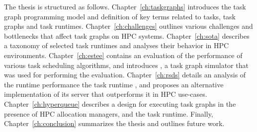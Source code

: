 The thesis is structured as follows. Chapter~\ref{ch:taskgraphs} introduces the task graph
programming model and definition of key terms related to tasks, task graphs and task runtimes.
Chapter~\ref{ch:challenges} outlines various challenges and bottlenecks that affect task graphs
on HPC systems. Chapter~\ref{ch:sota} describes a taxonomy of selected task runtimes and
analyses their behavior in HPC environments. Chapter~\ref{ch:estee} contains an evaluation
of the performance of various task scheduling algorithms, and introduces \estee{}, a
task graph simulator that was used for performing the evaluation. Chapter~\ref{ch:rsds}
details an analysis of the runtime performance the task runtime \dask{}, and
proposes an alternative implementation of its server that outperforms it in HPC use-cases.
Chapter~\ref{ch:hyperqueue} describes a design for executing task graphs in the presence of HPC
allocation managers, and the \hyperqueue{} task runtime. Finally,
Chapter~\ref{ch:conclusion} summarizes the thesis and outlines future work.
